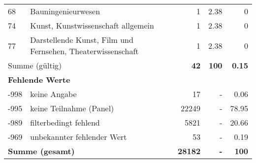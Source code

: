 \begin{longtable}{lXrrr}
        68 & \multicolumn{1}{X}{Bauningenieurwesen} & %
          \num{1} &
          \num[round-mode=places,round-precision=2]{2.38} &
          \num[round-mode=places,round-precision=2]{0} \\

        74 & \multicolumn{1}{X}{Kunst, Kunstwissenschaft allgemein} & %
          \num{1} &
          \num[round-mode=places,round-precision=2]{2.38} &
          \num[round-mode=places,round-precision=2]{0} \\

        77 & \multicolumn{1}{X}{Darstellende Kunst, Film und Fernsehen, Theaterwissenschaft} & %
          \num{1} &
          \num[round-mode=places,round-precision=2]{2.38} &
          \num[round-mode=places,round-precision=2]{0} \\

     \midrule
     \multicolumn{2}{l}{Summe (gültig)} &
       \textbf{\num{42}} &
     \textbf{\num{100}} &
       \textbf{\num[round-mode=places,round-precision=2]{0.15}} \\
     \multicolumn{5}{l}{\textbf{Fehlende Werte}}\\
       -998 &
       keine Angabe &
         \num{17} &
        - &
         \num[round-mode=places,round-precision=2]{0.06} \\
       -995 &
       keine Teilnahme (Panel) &
         \num{22249} &
        - &
         \num[round-mode=places,round-precision=2]{78.95} \\
       -989 &
       filterbedingt fehlend &
         \num{5821} &
        - &
         \num[round-mode=places,round-precision=2]{20.66} \\
       -969 &
       unbekannter fehlender Wert &
         \num{53} &
        - &
         \num[round-mode=places,round-precision=2]{0.19} \\
     \midrule
     \multicolumn{2}{l}{\textbf{Summe (gesamt)}} &
          \textbf{\num{28182}} &
        \textbf{-} &
        \textbf{\num{100}} \\
     \bottomrule
     \end{longtable}
     
